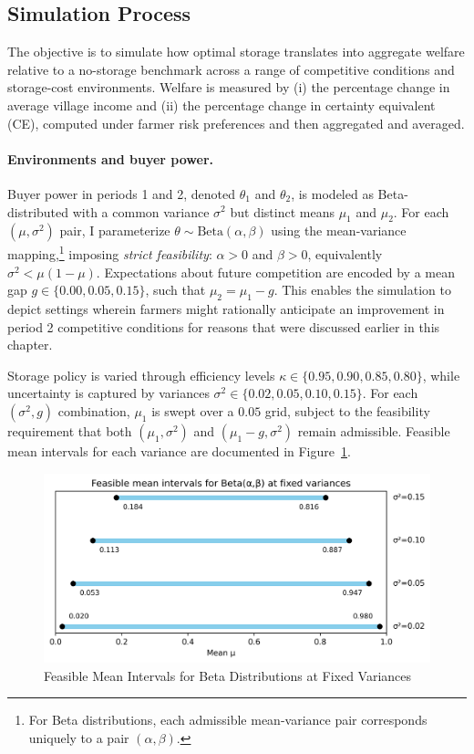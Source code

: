 \subsection{Simulation Process}
\noindent 
The objective is to simulate how optimal storage translates into aggregate welfare relative to a no-storage benchmark across a range of competitive conditions and storage-cost environments. Welfare is measured by (i) the percentage change in average village income and (ii) the percentage change in certainty equivalent (CE), computed under farmer risk preferences and then aggregated and averaged.

\paragraph{Environments and buyer power.}
Buyer power in periods 1 and 2, denoted $\theta_1$ and $\theta_2$, is modeled as Beta-distributed with a common variance $\sigma^2$ but distinct means $\mu_1$ and $\mu_2$. For each $(\mu,\sigma^2)$ pair, I parameterize $\theta\sim\text{Beta}(\alpha,\beta)$ using the mean-variance mapping,\footnote{For Beta distributions, each admissible mean-variance pair corresponds uniquely to a pair $(\alpha,\beta)$.} imposing \emph{strict feasibility}: $\alpha>0$ and $\beta>0$, equivalently $\sigma^2<\mu(1-\mu)$. Expectations about future competition are encoded by a mean gap $g\in\{0.00,0.05,0.15\}$, such that $\mu_2=\mu_1-g$. This enables the simulation to depict settings wherein farmers might rationally anticipate an improvement in period 2 competitive conditions for reasons that were discussed earlier in this chapter.

Storage policy is varied through efficiency levels $\kappa\in\{0.95,0.90,0.85,0.80\}$, while uncertainty is captured by variances $\sigma^2\in\{0.02,0.05,0.10,0.15\}$. For each $(\sigma^2,g)$ combination, $\mu_1$ is swept over a $0.05$ grid, subject to the feasibility requirement that both $(\mu_1,\sigma^2)$ and $(\mu_1-g,\sigma^2)$ remain admissible. Feasible mean intervals for each variance are documented in Figure~\ref{fig:parameter_range_Beta_distribution}.

\begin{figure}[ht!]
    \centering
    \includegraphics[width=0.90\linewidth]{model_figures/parameter_range_Beta_distribution.png}
    \caption{Feasible Mean Intervals for Beta Distributions at Fixed Variances}
    \label{fig:parameter_range_Beta_distribution}
\end{figure}


